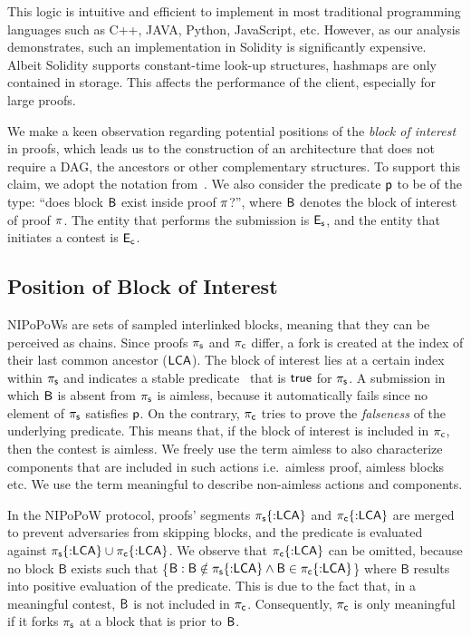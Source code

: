 This logic is intuitive and efficient to implement in most traditional
programming languages such as C++, JAVA, Python, JavaScript, etc. However, as
our analysis demonstrates, such an implementation in Solidity is significantly
expensive. Albeit Solidity supports constant-time look-up structures, hashmaps
are only contained in storage. This affects the performance of the client,
especially for large proofs.

We make a keen observation regarding potential positions of the \emph{block of
interest} in proofs, which leads us to the construction of an architecture that
does not require a DAG, the ancestors or other complementary structures. To
support this claim, we adopt the notation from~\cite{nipopows}. We also
consider the predicate $\mathsf{p}$ to be of the type: ``does block $\mathsf{B}$ exist
inside proof $\mathsf{\pi}$?'', where $\mathsf{B}$ denotes the block of interest of proof
$\mathsf{\pi}$. The entity that performs the submission is $\mathsf{E_{s}}$, and the entity that
initiates a contest is $\mathsf{E_{c}}$.

\subsection{Position of Block of Interest} NIPoPoWs are sets of sampled
interlinked blocks, meaning that they can be perceived as chains. Since proofs
$\mathsf{\pi_{s}}$ and $\mathsf{\pi_{c}}$ differ, a fork is created at the index of
their last common ancestor ($\mathsf{LCA}$). The block of interest lies at a certain
index within $\mathsf{\pi_{s}}$ and indicates a stable predicate~\cite{nipopows,
generic-client} that is $\textsf{true}$ for $\mathsf{\pi_{s}}$. A submission in which $\mathsf{B}$ is
absent from $\mathsf{\pi_{s}}$ is aimless, because it automatically fails since no element
of $\mathsf{\pi_{s}}$ satisfies $\mathsf{p}$. On the contrary, $\mathsf{\pi_{c}}$ tries to prove the
\emph{falseness} of the underlying predicate. This means that, if the block of
interest is included in $\mathsf{\pi_{c}}$, then the contest is aimless. We freely use the
term aimless to also characterize components that are included in such actions
i.e.\ aimless proof, aimless blocks etc. We use the term meaningful to describe
non-aimless actions and components.

\newcommand{\block}{\mathsf{B}}

In the NIPoPoW protocol, proofs' segments $\mathsf{\pi_{s}}\{{{:}}\mathsf{LCA}\}$ and
$\mathsf{\pi_{c}}\{{:}\mathsf{LCA}\}$ are merged to prevent adversaries from skipping
blocks, and the predicate is evaluated against $\mathsf{\pi_{s}}\{{:}\mathsf{LCA}\} \cup
\mathsf{\pi_{c}}\{{:}\mathsf{LCA}\}$. We observe that $\mathsf{\pi_{c}}\{{:}\mathsf{LCA}\}$ can be omitted, because no
block $\block$ exists such that \{$\block : \block \notin \pis\{{:}\lca\} \land
\block \in \pic\{{:}\lca\}$\} where $\block$ results into positive evaluation
of the predicate. This is due to the fact that, in a meaningful contest, $\mathsf{B}$
is not included in $\mathsf{\pi_{c}}$. Consequently, $\mathsf{\pi_{c}}$ is only meaningful if it forks
$\mathsf{\pi_{s}}$ at a block that is prior to $\mathsf{B}$.

